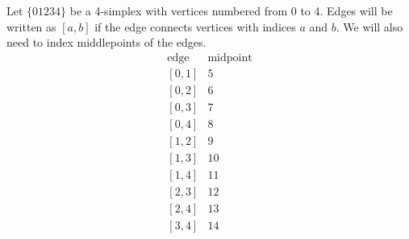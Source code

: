\documentclass[a4paper,12pt]{amsart}
\numberwithin{equation}{section}
\begin{document}
Let $\{01234\}$ be a 4-simplex with vertices numbered from 0 to 4. Edges will be written as $[a,b]$ if the edge connects vertices with indices $a$ and $b$.
We will also need to index middlepoints of the edges. 
$$
\begin{array}{cc}
\mbox{edge} & \mbox{midpoint} \\
\left[0,1\right] & 5 \\
\left[0,2\right] & 6 \\
\left[0,3\right] & 7 \\
\left[0,4\right] & 8 \\
\left[1,2\right] & 9 \\
\left[1,3\right] & 10 \\
\left[1,4\right] & 11 \\
\left[2,3\right] & 12 \\
\left[2,4\right] & 13 \\
\left[3,4\right] & 14 \\
\end{array}
$$
\end{document}

